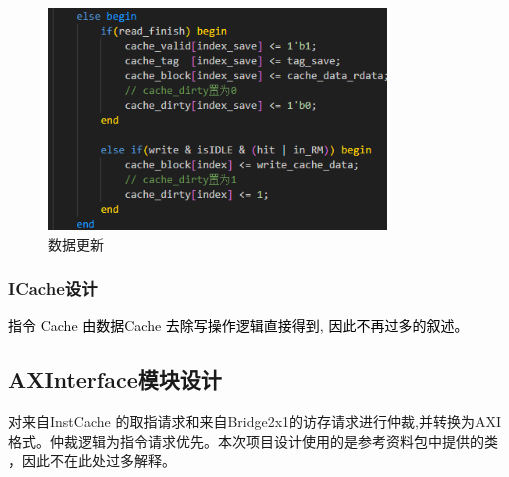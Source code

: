 \begin{flushleft}
\begin{figure}[htbp]
    \centering
    \includegraphics[width=0.8\textwidth]{image/cacheR.png}
    \caption{数据更新}
\end{figure}

\newpage
\subsubsection{ICache设计}
\textcolor{black}{指令 Cache 由数据Cache 去除写操作逻辑直接得到, 因此不再过多的叙述。}
\end{flushleft}


\begin{flushleft}
\subsection{AXInterface模块设计}
对来自InstCache 的取指请求和来自Bridge2x1的访存请求进行仲裁,并转换为AXI格式。仲裁逻辑为指令请求优先。本次项目设计使用的是参考资料包中提供的类 ，因此不在此处过多解释。
\end{flushleft}
